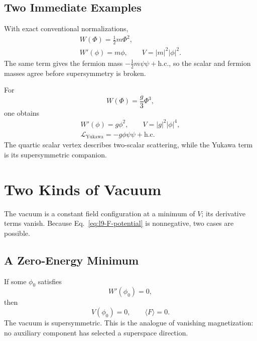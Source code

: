 \subsection{Two Immediate Examples}

With exact conventional normalizations,
\begin{equation}
\begin{gathered}
W(\Phi)=\frac12m\Phi^2,\\
W'(\phi)=m\phi,
\qquad V=|m|^2|\phi|^2.
\end{gathered}
\label{eq:l9-quadratic-W}
\end{equation}
The same term gives the fermion mass
\(-\tfrac12m\psi\psi+\mathrm{h.c.}\), so the scalar and fermion masses agree before supersymmetry is broken.

For
\begin{equation}
W(\Phi)=\frac{g}{3}\Phi^3,
\end{equation}
one obtains
\begin{equation}
\begin{gathered}
W'(\phi)=g\phi^2,
\qquad V=|g|^2|\phi|^4,\\
\mathcal L_{\mathrm{Yukawa}}
=-g\phi\psi\psi+\mathrm{h.c.}
\end{gathered}
\label{eq:l9-cubic-W}
\end{equation}
The quartic scalar vertex describes two-scalar scattering, while the Yukawa term is its supersymmetric companion.

\section{Two Kinds of Vacuum}

The vacuum is a constant field configuration at a minimum of \(V\); its derivative terms vanish. Because Eq.~\eqref{eq:l9-F-potential} is nonnegative, two cases are possible.

\subsection{A Zero-Energy Minimum}

If some \(\phi_0\) satisfies
\begin{equation}
W'(\phi_0)=0,
\end{equation}
then
\begin{equation}
V(\phi_0)=0,
\qquad
\langle F\rangle=0.
\label{eq:l9-unbroken-F}
\end{equation}
The vacuum is supersymmetric. This is the analogue of vanishing magnetization: no auxiliary component has selected a superspace direction.

